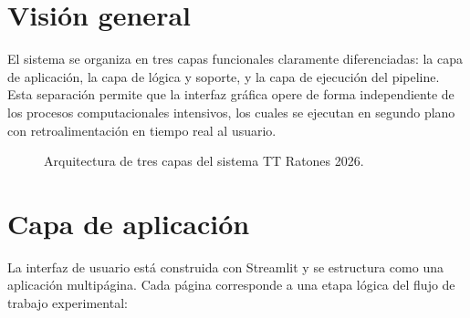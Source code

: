 \documentclass[12pt]{report}
\begin{document}
\section{Visión general}

El sistema se organiza en tres capas funcionales claramente diferenciadas:
la capa de aplicación, la capa de lógica y soporte, y la capa de ejecución
del pipeline. Esta separación permite que la interfaz gráfica opere de forma
independiente de los procesos computacionales intensivos, los cuales se ejecutan
en segundo plano con retroalimentación en tiempo real al usuario.

\begin{figure}[H]
    \centering
    \caption{Arquitectura de tres capas del sistema TT Ratones 2026.}
    \label{fig:arquitectura}
\end{figure}

\section{Capa de aplicación}

La interfaz de usuario está construida con Streamlit y se estructura como una
aplicación multipágina. Cada página corresponde a una etapa lógica del flujo
de trabajo experimental:
\end{document}
